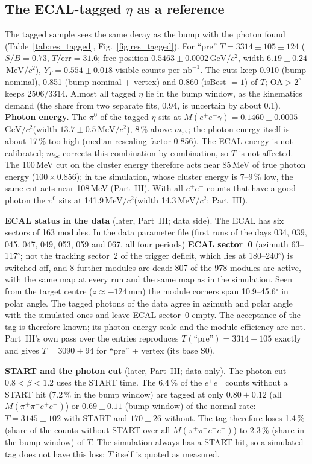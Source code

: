\documentclass[11pt,a4paper]{article}
\newcommand{\piz}{\ensuremath{\pi^{0}}\xspace}
\newcommand{\ee}{\ensuremath{e^{+}e^{-}}\xspace}
\newcommand{\Mfour}{\ensuremath{M(\pi^{+}\pi^{-}e^{+}e^{-})}\xspace}
\newcommand{\nbinv}{\ensuremath{\mathrm{nb}^{-1}}\xspace}
\newcommand{\GeVcc}{\ensuremath{\mathrm{GeV}/c^{2}}\xspace}
\newcommand{\MeVcc}{\ensuremath{\mathrm{MeV}/c^{2}}\xspace}
\begin{document}
\subsection{The ECAL-tagged \texorpdfstring{$\eta$}{eta} as a reference}
\label{sec:tagged}
The tagged sample sees the same decay as the bump with the photon found (Table~\ref{tab:res_tagged}, Fig.~\ref{fig:res_tagged}).
For ``pre'' $T=3314\pm105\pm124$ ($S/B=0.73$, $T/\mathrm{err}=31.6$; free position $0.5463\pm0.0002$\,\GeVcc, width $6.19\pm0.24$\,\MeVcc),
$Y_T=0.554\pm0.018$ visible counts per \nbinv. The cuts keep 0.910 (bump nominal), 0.851 (bump nominal + vertex) and 0.860 (isBest $=1$) of $T$; OA$>2^\circ$ keeps
$2506/3314$. Almost all tagged $\eta$ lie in the bump window, as the kinematics demand (the share from two separate fits, 0.94, is
uncertain by about 0.1). \textbf{Photon energy.} The \piz of the tagged $\eta$ sits at $M(\ee\gamma)=0.1460\pm0.0005$\,\GeVcc (width
$13.7\pm0.5$\,\MeVcc), 8\,\% above $m_{\pi^0}$; the photon energy itself is about 17\,\% too high (median rescaling factor 0.856).
The ECAL energy is not calibrated; $m_{5c}$ corrects this combination by combination, so $T$ is not affected. The 100\,MeV cut on the cluster energy
therefore acts near 85\,MeV of true photon energy ($100\times0.856$); in the simulation, whose cluster energy is 7--9\,\% low, the same cut
acts near 108\,MeV (Part~III). With all \ee counts that have a good photon the \piz sits at 141.9\,\MeVcc (width 14.3\,\MeVcc; Part~III).

\textbf{ECAL status in the data} (later, Part~III; data side). The ECAL has six sectors of 163 modules. In the data parameter file (first
runs of the days 034, 039, 045, 047, 049, 053, 059 and 067, all four periods) \textbf{ECAL sector~0} (azimuth 63--117$^\circ$; not the tracking
sector~2 of the trigger deficit, which lies at 180--240$^\circ$) is switched off, and 8 further modules are dead: 807 of the 978 modules are
active, with the same map at every run and the same map as in the simulation. Seen from the target centre ($z\approx-124$\,mm) the module
corners span 10.9--45.6$^\circ$ in polar angle. The tagged photons of the data agree in azimuth and polar angle with the simulated ones and
leave ECAL sector~0 empty. The acceptance of the tag is therefore known; its photon energy scale and the module efficiency are not.
Part~III's own pass over the entries reproduces $T(\text{``pre''})=3314\pm105$ exactly and gives $T=3090\pm94$ for ``pre'' + vertex (its base S0).

\textbf{START and the photon cut} (later, Part~III; data only). The photon cut $0.8<\beta<1.2$ uses the START time. The 6.4\,\% of the \ee counts
without a START hit (7.2\,\% in the bump window) are tagged at only $0.80\pm0.12$ (all \Mfour) or $0.69\pm0.11$ (bump window) of the normal
rate: $T=3145\pm102$ with START and $170\pm26$ without. The tag therefore loses 1.4\,\% (share of the counts without START over all \Mfour) to
2.3\,\% (share in the bump window) of $T$. The simulation always has a START hit, so a simulated tag does not have this loss; $T$ itself is
quoted as measured.
\end{document}
